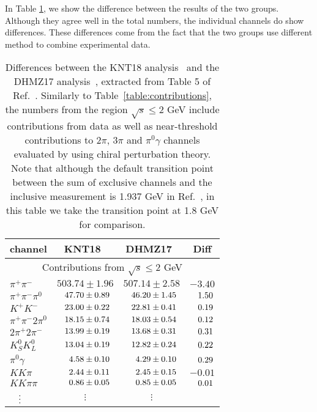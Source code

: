 In Table \ref{table:comparison}, we show the difference
between the results of the two groups.  Although they 
agree well in the total numbers, the individual channels
do show differences.  These differences come from the
fact that the two groups use different method to combine
experimental data.


\begin{table*} 
\caption{Differences between the KNT18 analysis~\cite{KNT18} 
and the DHMZ17 analysis~\cite{DHMNZ17}, extracted from 
Table 5 of Ref.~\cite{KNT18}. 
Similarly to Table~\ref{table:contributions}, the numbers
from the region $\sqrt{s} \leq 2$ GeV
include contributions from data as well as near-threshold
contributions to $2\pi$, $3\pi$ and $\pi^0\gamma$ channels
evaluated by using chiral perturbation theory.
Note that although the default transition point
between the sum of exclusive channels and the inclusive
measurement is 1.937 GeV in Ref.~\cite{KNT18}, in this 
table we take the transition point at 1.8 GeV for comparison.}
%
\label{table:comparison}
%
\begin{center} \begin{tabular}{|l|c|c|c|}
\hline
channel        & KNT18~\cite{KNT18}    & DHMZ17~\cite{HLMNT} & Diff \\
\hline
\multicolumn{4}{|c|}{Contributions from $\sqrt{s} \leq 2$ GeV} \\
\hline
$\pi^+\pi^-$   &    $503.74 \pm 1.96$  &    $507.14 \pm 2.58$    & $-3.40$ \\
$\pi^+\pi^-\pi^0$
               & $\hpz47.70 \pm 0.89$  & $\hpz46.20 \pm 1.45$ & $\hph1.50$ \\
$K^+ K^-$      & $\hpz23.00 \pm 0.22$  & $\hpz22.81 \pm 0.41$ & $\hph0.19$ \\
$\pi^+ \pi^- 2\pi^0$
               & $\hpz18.15 \pm 0.74$  & $\hpz18.03 \pm 0.54$ & $\hph0.12$ \\
$2\pi^+ 2\pi^-$& $\hpz13.99 \pm 0.19$  & $\hpz13.68 \pm 0.31$ & $\hph0.31$\\
$K_S^0 K_L^0$  & $\hpz13.04 \pm 0.19$  & $\hpz12.82 \pm 0.24$ & $\hph0.22$ \\
$\pi^0 \gamma$ & $\hpzz4.58 \pm 0.10$  & $\hpzz4.29 \pm 0.10$ & $\hph0.29$ \\
$KK\pi$        & $\hpzz2.44 \pm 0.11$  & $\hpzz2.45 \pm 0.15$ & $-0.01$ \\
$KK\pi\pi$     & $\hpzz0.86 \pm 0.05$  & $\hpzz0.85 \pm 0.05$ & $\hph0.01$ \\
$\hpzz\vdots$  &  $\vdots$  &  $\vdots$   & \\

\end{tabular}
\end{center}
\end{table*}

